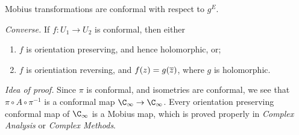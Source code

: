 \begin{corollary}
	Mobius transformations are conformal with respect to $g^E$.
\end{corollary}

\vspace{-6pt}

\emph{Converse.} If $f:U_1\to U_2$ is conformal, then either
\begin{enumerate}
	\shortskip
	\item $f$ is orientation preserving, and hence holomorphic, or;
	\item $f$ is orientiation reversing, and $f(z)=g(\overline{z})$, where $g$ is holomorphic.
\end{enumerate}

\emph{Idea of proof.} Since $\pi$ is conformal, and isometries are conformal, we see that $\pi\circ A \circ\pi^{-1}$ is a conformal map $\C_\infty \to \C_\infty$. Every orientation preserving conformal map of $\C_\infty$ is a Mobius map, which is proved properly in \emph{Complex Analysis} or \emph{Complex Methods}.

